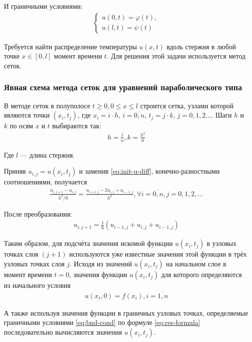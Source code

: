 И граничными условиями:
\begin{align}\label{eq:bnd-cond}
	\begin{cases}
		u(0,t) = \varphi(t), \\
		u(l,t) = \psi(t)
	\end{cases}
\end{align}

Требуется найти распределение температуры \(u(x,t)\) вдоль стержня в любой точке \(x\in[0,l]\) момент времени \(t\). Для решения этой задачи используется метод сеток.

\subsubsection{Явная схема метода сеток для уравнений параболического типа}

В методе сеток в полуполосе \(t \geq 0, 0 \leq x \leq l\) строится сетка, узлами которой являются точки \((x_i, t_j)\), где \(x_i = i \cdot h\), \(i = \overline{0,n}\), \(t_j=j\cdot k\), \(j = 0,1,2\dots\). Шаги \(h\) и \(k\) по осям \(x\) и \(t\) выбираются так:
\begin{align}
	h = \frac{l}{n}, k = \frac{h^2}{6}
\end{align}

Где \(l\) --- длина стержня.

Приняв \(u_{i,j} = u(x_i,t_j)\) и заменив \cref{eq:init-u-diff}, конечно-разностными соотношениями, получается
\begin{align}
	\frac{u_{i,j+1} -u_{i,j}}{h^2/6} = \frac{u_{i+1,j} - 2 u_{i,j} + u_{i - 1,j}}{h^2}, \forall i = \overline{0,n}, j = 0,1,2,\dots
\end{align}

После преобразования:
\begin{align}\label{eq:res-formula}
	u_{i,j+1} = \frac{1}{6}(u_{i-1, j} + u_{i,j} + u_{i-1, j})
\end{align}

Таким образом, для подсчёта значения искомой функции \(u(x_i, t_j)\) в узловых точках слоя \((j + 1)\) используются уже известные значения этой функции в трёх узловых точках слоя \(j\). Исходя из значений \(u(x_i, t_j)\) на начальном слое в момент времени \(t = 0\), значения функции \(u(x_i, t_j)\) для которого определяются из начального условия
\begin{align}
	u(x_i, 0)=f(x_i), i = \overline{1,n}
\end{align}

А также используя значения функции в граничных узловых точках, определяемые граничными условиями \cref{eq:bnd-cond} по формуле \cref{eq:res-formula} последовательно вычисляются значения \(u(x_i, t_j)\).

